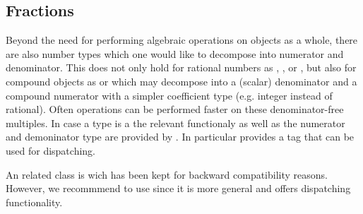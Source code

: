 \subsection{Fractions}

Beyond the need for performing algebraic operations on objects as a 
whole, there are also number types which one would like to decompose into 
numerator and denominator. This does not only hold for rational numbers 
as , ,  or , but 
also for compound objects as  or  
which may decompose into a (scalar) 
denominator and a compound numerator with a simpler coefficient type 
(e.g. integer instead of rational). Often operations can be performed faster on 
these denominator-free multiples. In case a type is a  
the relevant functionaly as well as the numerator and demoninator 
type are provided by . In particular  
 provides a tag  that can be
used for dispatching.

An related class is  wich has been kept for backward 
compatibility reasons. However, we recommmend to use  since
it is more general and offers dispatching functionality. 





